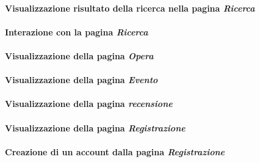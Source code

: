 \paragraph{Visualizzazione risultato della ricerca nella pagina \textit{Ricerca}}
\label{analisi-casi-uso-attori-principali-utente-generico-12}

\paragraph{Interazione con la pagina \textit{Ricerca}}
\label{analisi-casi-uso-attori-principali-utente-generico-13}

\paragraph{Visualizzazione della pagina \textit{Opera}}
\label{analisi-casi-uso-attori-principali-utente-generico-14}

\paragraph{Visualizzazione della pagina \textit{Evento}}
\label{analisi-casi-uso-attori-principali-utente-generico-15}

\paragraph{Visualizzazione della pagina \textit{recensione}}
\label{analisi-casi-uso-attori-principali-utente-generico-16}

\paragraph{Visualizzazione della pagina \textit{Registrazione}}
\label{analisi-casi-uso-attori-principali-utente-generico-17}

\paragraph{Creazione di un account dalla pagina \textit{Registrazione}}
\label{analisi-casi-uso-attori-principali-utente-generico-18}

